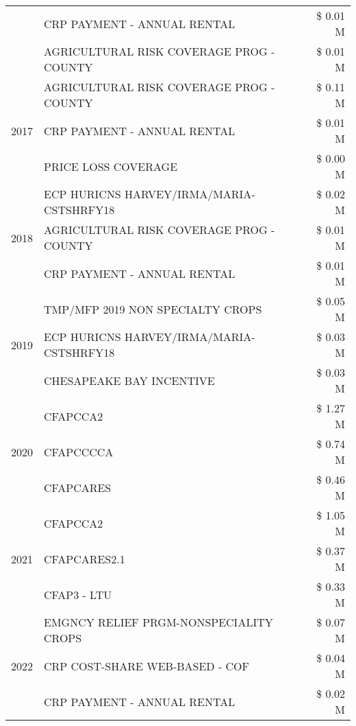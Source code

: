 \begin{tabular}{llr}
 & CRP PAYMENT - ANNUAL RENTAL & \$ 0.01 M \\
 & AGRICULTURAL RISK COVERAGE PROG - COUNTY & \$ 0.01 M \\
\cline{1-3}
\multirow[t]{3}{*}{2017} & AGRICULTURAL RISK COVERAGE PROG - COUNTY & \$ 0.11 M \\
 & CRP PAYMENT - ANNUAL RENTAL & \$ 0.01 M \\
 & PRICE LOSS COVERAGE & \$ 0.00 M \\
\cline{1-3}
\multirow[t]{3}{*}{2018} & ECP HURICNS HARVEY/IRMA/MARIA-CSTSHRFY18 & \$ 0.02 M \\
 & AGRICULTURAL RISK COVERAGE PROG - COUNTY & \$ 0.01 M \\
 & CRP PAYMENT - ANNUAL RENTAL & \$ 0.01 M \\
\cline{1-3}
\multirow[t]{3}{*}{2019} & TMP/MFP 2019 NON SPECIALTY CROPS & \$ 0.05 M \\
 & ECP HURICNS HARVEY/IRMA/MARIA-CSTSHRFY18 & \$ 0.03 M \\
 & CHESAPEAKE BAY INCENTIVE & \$ 0.03 M \\
\cline{1-3}
\multirow[t]{3}{*}{2020} & CFAPCCA2 & \$ 1.27 M \\
 & CFAPCCCCA & \$ 0.74 M \\
 & CFAPCARES & \$ 0.46 M \\
\cline{1-3}
\multirow[t]{3}{*}{2021} & CFAPCCA2 & \$ 1.05 M \\
 & CFAPCARES2.1 & \$ 0.37 M \\
 & CFAP3 - LTU & \$ 0.33 M \\
\cline{1-3}
\multirow[t]{3}{*}{2022} & EMGNCY RELIEF PRGM-NONSPECIALITY CROPS & \$ 0.07 M \\
 & CRP COST-SHARE WEB-BASED - COF & \$ 0.04 M \\
 & CRP PAYMENT - ANNUAL RENTAL & \$ 0.02 M \\
\cline{1-3}
\bottomrule
\end{tabular}
